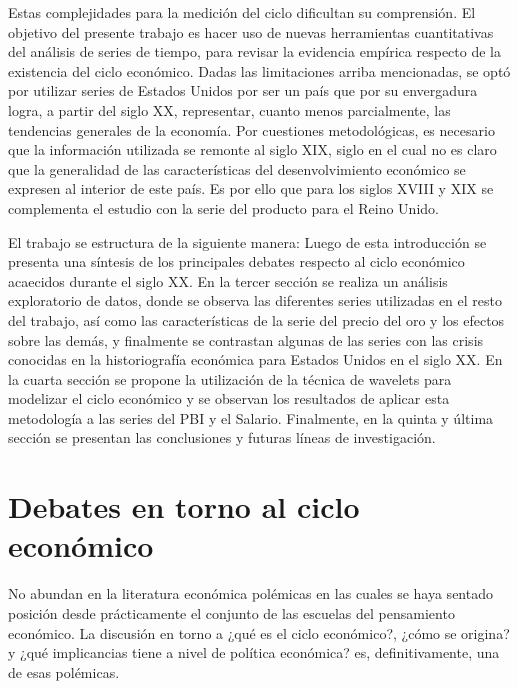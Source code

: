 \documentclass[a4paper]{article}
\begin{document}
Estas complejidades para la medición del ciclo dificultan su comprensión. El objetivo del presente trabajo es hacer uso de nuevas herramientas cuantitativas del análisis de series de tiempo, para revisar la evidencia empírica respecto de la existencia del ciclo económico. Dadas las limitaciones arriba mencionadas, se optó por utilizar series de Estados Unidos por ser un país que por su envergadura logra, a partir del siglo XX, representar, cuanto menos parcialmente, las tendencias generales de la economía. Por cuestiones metodológicas, es necesario que la información utilizada se remonte al siglo XIX, siglo en el cual no es claro que la generalidad de las características del desenvolvimiento económico se expresen al interior de este país. Es por ello que para los siglos XVIII y XIX se complementa el estudio con la serie del producto para el Reino Unido. 

El trabajo se estructura de la siguiente manera: Luego de esta introducción se presenta una síntesis de los principales debates respecto al ciclo económico acaecidos durante el siglo XX. En la tercer sección se realiza un análisis exploratorio de datos, donde se observa las diferentes series utilizadas en el resto del trabajo, así como las características de la serie del precio del oro y los efectos sobre las demás, y finalmente se contrastan algunas de las series con las crisis conocidas en la historiografía económica para Estados Unidos en el siglo XX. En la cuarta sección se propone la utilización de la técnica de wavelets para modelizar el ciclo económico y se observan los resultados de aplicar esta metodología a las series del PBI y el Salario. Finalmente, en la quinta y última sección se presentan las conclusiones y futuras líneas de investigación.


\section{Debates en torno al ciclo económico}

No abundan en la literatura económica polémicas en las cuales se haya sentado posición desde prácticamente el conjunto de las escuelas del pensamiento económico. La discusión en torno a ¿qué es el ciclo económico?, ¿cómo se origina?  y ¿qué implicancias tiene a nivel de política económica? es, definitivamente, una de esas polémicas.
\end{document}
